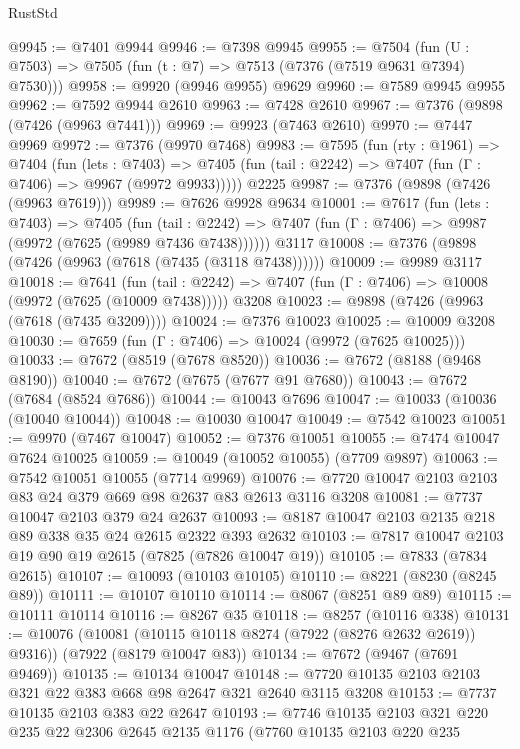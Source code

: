 \begin{lexlean}{RustStd}
\begin{coremodule}
@9945 := @7401 @9944
@9946 := @7398 @9945
@9955 := @7504 (fun (U : @7503) => @7505 (fun (t : @7) => @7513 (@7376 (@7519 @9631 @7394) @7530)))
@9958 := @9920 (@9946 @9955) @9629
@9960 := @7589 @9945 @9955
@9962 := @7592 @9944 @2610
@9963 := @7428 @2610
@9967 := @7376 (@9898 (@7426 (@9963 @7441)))
@9969 := @9923 (@7463 @2610)
@9970 := @7447 @9969
@9972 := @7376 (@9970 @7468)
@9983 := @7595
    (fun (rty : @1961) =>
    @7404
      (fun (lets : @7403) =>
      @7405 (fun (tail : @2242) => @7407 (fun (Γ : @7406) => @9967 (@9972 @9933)))))
    @2225
@9987 := @7376 (@9898 (@7426 (@9963 @7619)))
@9989 := @7626 @9928 @9634
@10001 := @7617
    (fun (lets : @7403) =>
    @7405
      (fun (tail : @2242) => @7407 (fun (Γ : @7406) => @9987 (@9972 (@7625 (@9989 @7436 @7438))))))
    @3117
@10008 := @7376 (@9898 (@7426 (@9963 (@7618 (@7435 (@3118 @7438))))))
@10009 := @9989 @3117
@10018 := @7641
    (fun (tail : @2242) => @7407 (fun (Γ : @7406) => @10008 (@9972 (@7625 (@10009 @7438)))))
    @3208
@10023 := @9898 (@7426 (@9963 (@7618 (@7435 @3209))))
@10024 := @7376 @10023
@10025 := @10009 @3208
@10030 := @7659 (fun (Γ : @7406) => @10024 (@9972 (@7625 @10025)))
@10033 := @7672 (@8519 (@7678 @8520))
@10036 := @7672 (@8188 (@9468 @8190))
@10040 := @7672 (@7675 (@7677 @91 @7680))
@10043 := @7672 (@7684 (@8524 @7686))
@10044 := @10043 @7696
@10047 := @10033 (@10036 (@10040 @10044))
@10048 := @10030 @10047
@10049 := @7542 @10023
@10051 := @9970 (@7467 @10047)
@10052 := @7376 @10051
@10055 := @7474 @10047 @7624 @10025
@10059 := @10049 (@10052 @10055) (@7709 @9897)
@10063 := @7542 @10051 @10055 (@7714 @9969)
@10076 := @7720 @10047 @2103 @2103 @83 @24 @379 @669 @98 @2637 @83 @2613 @3116 @3208
@10081 := @7737 @10047 @2103 @379 @24 @2637
@10093 := @8187 @10047 @2103 @2135 @218 @89 @338 @35 @24 @2615 @2322 @393 @2632
@10103 := @7817 @10047 @2103 @19 @90 @19 @2615 (@7825 (@7826 @10047 @19))
@10105 := @7833 (@7834 @2615)
@10107 := @10093 (@10103 @10105)
@10110 := @8221 (@8230 (@8245 @89))
@10111 := @10107 @10110
@10114 := @8067 (@8251 @89 @89)
@10115 := @10111 @10114
@10116 := @8267 @35
@10118 := @8257 (@10116 @338)
@10131 := @10076
    (@10081 (@10115 @10118 @8274 (@7922 (@8276 @2632 @2619)) @9316))
    (@7922 (@8179 @10047 @83))
@10134 := @7672 (@9467 (@7691 @9469))
@10135 := @10134 @10047
@10148 := @7720 @10135 @2103 @2103 @321 @22 @383 @668 @98 @2647 @321 @2640 @3115 @3208
@10153 := @7737 @10135 @2103 @383 @22 @2647
@10193 := @7746
    @10135
    @2103
    @321
    @220
    @235
    @22
    @2306
    @2645
    @2135
    @1176
    (@7760
      @10135
      @2103
      @220
      @235

\end{coremodule}
\end{lexlean}
